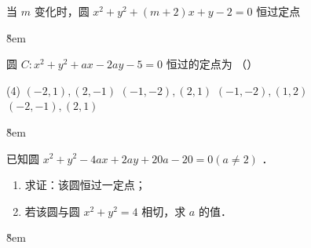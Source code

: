 \begin{example}
    当 $m$ 变化时，圆 $x^2+y^2+(m+2) x+y-2=0$ 恒过定点 \underline{\qquad}
\end{example}

\v{8em}

\begin{example}
    圆 $C: x^2+y^2+a x-2 a y-5=0$ 恒过的定点为 （\qquad）
    \begin{tasks}(4)
        \task $(-2,1),(2,-1)$
        \task $(-1,-2),(2,1)$
        \task $(-1,-2),(1,2)$
        \task $(-2,-1),(2,1)$
    \end{tasks}
\end{example}

\v{8em}

\begin{example}
    已知圆 $x^2+y^2-4 a x+2 a y+20 a-20=0(a \neq 2)$ ．
    \begin{enumerate}
        \item 求证：该圆恒过一定点；
        \item 若该圆与圆 $x^2+y^2=4$ 相切，求 $a$ 的值．
    \end{enumerate}
\end{example}

\v{8em}
